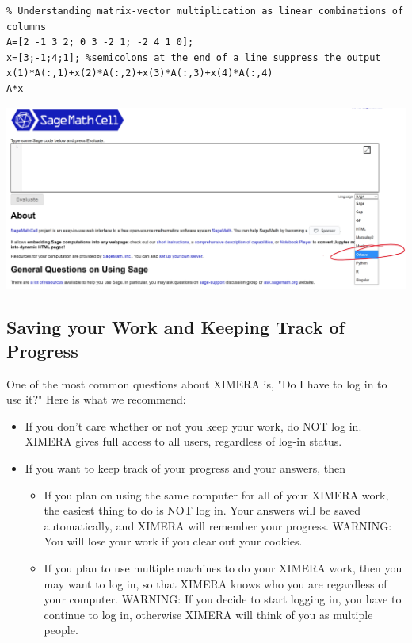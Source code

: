 \documentclass{ximera}
\begin{document}
\begin{verbatim}
% Understanding matrix-vector multiplication as linear combinations of columns
A=[2 -1 3 2; 0 3 -2 1; -2 4 1 0];
x=[3;-1;4;1]; %semicolons at the end of a line suppress the output
x(1)*A(:,1)+x(2)*A(:,2)+x(3)*A(:,3)+x(4)*A(:,4)
A*x
\end{verbatim} 

\begin{image}
\includegraphics{SageCell.jpg}
\end{image}

\subsection*{Saving your Work and Keeping Track of Progress}
One of the most common questions about XIMERA is, "Do I have to log in to use it?"  Here is what we recommend:
\begin{itemize}
\item If you don't care whether or not you keep your work, do NOT log in.  XIMERA gives full access to all users, regardless of log-in status.
\item If you want to keep track of your progress and your answers, then
\begin{itemize}
\item If you plan on using the same computer for all of your XIMERA work, the easiest thing to do is NOT log in.  Your answers will be saved automatically, and XIMERA will remember your progress.  WARNING: You will lose your work if you clear out your cookies.
\item If you plan to use multiple machines to do your XIMERA work, then you may want to log in, so that XIMERA knows who you are regardless of your computer.  WARNING: If you decide to start logging in, you have to continue to log in, otherwise XIMERA will think of you as multiple people.
\end{itemize}
\end{itemize}
\end{document}

